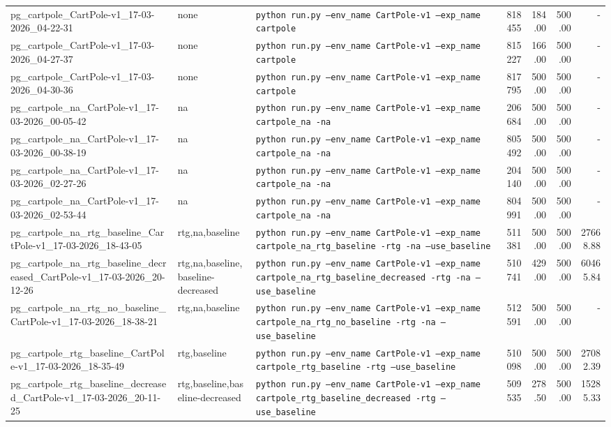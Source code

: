 \begin{table}[h]
\begin{tabular}{l l l r r r r}
pg\_cartpole\_CartPole-v1\_17-03-2026\_04-22-31 & none & \texttt{python run.py --env\_name CartPole-v1 --exp\_name cartpole} & 818455 & 184.00 & 500.00 & - \\
pg\_cartpole\_CartPole-v1\_17-03-2026\_04-27-37 & none & \texttt{python run.py --env\_name CartPole-v1 --exp\_name cartpole} & 815227 & 166.00 & 500.00 & - \\
pg\_cartpole\_CartPole-v1\_17-03-2026\_04-30-36 & none & \texttt{python run.py --env\_name CartPole-v1 --exp\_name cartpole} & 817795 & 500.00 & 500.00 & - \\
pg\_cartpole\_na\_CartPole-v1\_17-03-2026\_00-05-42 & na & \texttt{python run.py --env\_name CartPole-v1 --exp\_name cartpole\_na -na} & 206684 & 500.00 & 500.00 & - \\
pg\_cartpole\_na\_CartPole-v1\_17-03-2026\_00-38-19 & na & \texttt{python run.py --env\_name CartPole-v1 --exp\_name cartpole\_na -na} & 805492 & 500.00 & 500.00 & - \\
pg\_cartpole\_na\_CartPole-v1\_17-03-2026\_02-27-26 & na & \texttt{python run.py --env\_name CartPole-v1 --exp\_name cartpole\_na -na} & 204140 & 500.00 & 500.00 & - \\
pg\_cartpole\_na\_CartPole-v1\_17-03-2026\_02-53-44 & na & \texttt{python run.py --env\_name CartPole-v1 --exp\_name cartpole\_na -na} & 804991 & 500.00 & 500.00 & - \\
pg\_cartpole\_na\_rtg\_baseline\_CartPole-v1\_17-03-2026\_18-43-05 & rtg,na,baseline & \texttt{python run.py --env\_name CartPole-v1 --exp\_name cartpole\_na\_rtg\_baseline -rtg -na --use\_baseline} & 511381 & 500.00 & 500.00 & 27668.88 \\
pg\_cartpole\_na\_rtg\_baseline\_decreased\_CartPole-v1\_17-03-2026\_20-12-26 & rtg,na,baseline,baseline-decreased & \texttt{python run.py --env\_name CartPole-v1 --exp\_name cartpole\_na\_rtg\_baseline\_decreased -rtg -na --use\_baseline} & 510741 & 429.00 & 500.00 & 60465.84 \\
pg\_cartpole\_na\_rtg\_no\_baseline\_CartPole-v1\_17-03-2026\_18-38-21 & rtg,na,baseline & \texttt{python run.py --env\_name CartPole-v1 --exp\_name cartpole\_na\_rtg\_no\_baseline -rtg -na --use\_baseline} & 512591 & 500.00 & 500.00 & - \\
pg\_cartpole\_rtg\_baseline\_CartPole-v1\_17-03-2026\_18-35-49 & rtg,baseline & \texttt{python run.py --env\_name CartPole-v1 --exp\_name cartpole\_rtg\_baseline -rtg --use\_baseline} & 510098 & 500.00 & 500.00 & 27082.39 \\
pg\_cartpole\_rtg\_baseline\_decreased\_CartPole-v1\_17-03-2026\_20-11-25 & rtg,baseline,baseline-decreased & \texttt{python run.py --env\_name CartPole-v1 --exp\_name cartpole\_rtg\_baseline\_decreased -rtg --use\_baseline} & 509535 & 278.50 & 500.00 & 15285.33 \\

\end{tabular}
\end{table}
